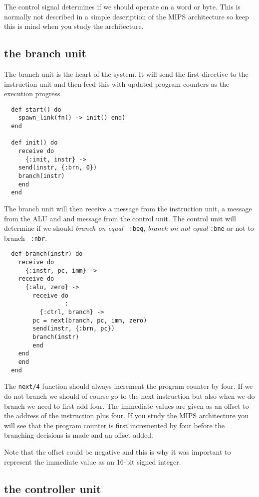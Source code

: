 \documentclass[a4paper,11pt]{article}
\begin{document}
The control signal determines if we should operate on a word or
byte. This is normally not described in a simple description of the MIPS
architecture so keep this is mind when you study the architecture.

\subsection{the branch unit}

The branch unit is the heart of the system. It will send the first
directive to the instruction unit and then feed this with updated
program counters as the execution progress.

\begin{verbatim}
  def start() do
    spawn_link(fn() -> init() end)
  end

  def init() do
    receive do
      {:init, instr} ->
	send(instr, {:brn, 0})
	branch(instr)
    end
  end
\end{verbatim}

The branch unit will then receive a message from the instruction unit,
a message from the ALU and and message from the control unit. The
control unit will determine if we should {\em branch on equal} {\tt
  :beq}, {\em branch on not equal} {\tt :bne} or not to branch {\tt
  :nbr}.

\begin{verbatim}
  def branch(instr) do
    receive do
      {:instr, pc, imm} ->
	receive do
	  {:alu, zero} ->
	    receive do 
                 :
	      {:ctrl, branch} ->
		pc = next(branch, pc, imm, zero)
		send(instr, {:brn, pc})
		branch(instr)		
	    end
	end
    end
  end
\end{verbatim}

The {\tt next/4} function should always increment the program counter
by four. If we do not branch we should of course go to the next
instruction but also when we do branch we need to first add four. The
immediate values are given as an offset to the address of the
instruction plus four. If you study the MIPS architecture you will see
that the program counter is first incremented by four before the
branching decisions is made and an offset added.

Note that the offset could be negative and this is why it was
important to represent the immediate value as an 16-bit signed
integer.


\subsection{the controller unit}
\end{document}
